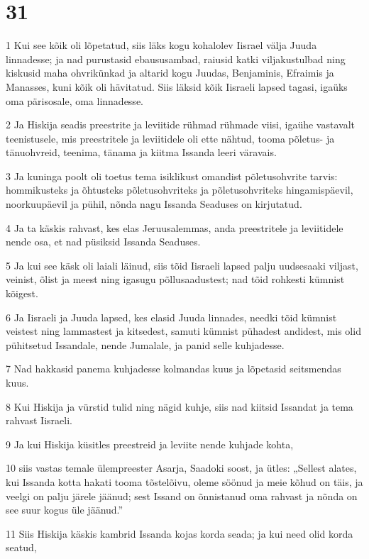 \chapter{31}

\par 1 Kui see kõik oli lõpetatud, siis läks kogu kohalolev Iisrael välja Juuda linnadesse; ja nad purustasid ebaususambad, raiusid katki viljakustulbad ning kiskusid maha ohvrikünkad ja altarid kogu Juudas, Benjaminis, Efraimis ja Manasses, kuni kõik oli hävitatud. Siis läksid kõik Iisraeli lapsed tagasi, igaüks oma pärisosale, oma linnadesse.
\par 2 Ja Hiskija seadis preestrite ja leviitide rühmad rühmade viisi, igaühe vastavalt teenistusele, mis preestritele ja leviitidele oli ette nähtud, tooma põletus- ja tänuohvreid, teenima, tänama ja kiitma Issanda leeri väravais.
\par 3 Ja kuninga poolt oli toetus tema isiklikust omandist põletusohvrite tarvis: hommikusteks ja õhtusteks põletusohvriteks ja põletusohvriteks hingamispäevil, noorkuupäevil ja pühil, nõnda nagu Issanda Seaduses on kirjutatud.
\par 4 Ja ta käskis rahvast, kes elas Jeruusalemmas, anda preestritele ja leviitidele nende osa, et nad püsiksid Issanda Seaduses.
\par 5 Ja kui see käsk oli laiali läinud, siis tõid Iisraeli lapsed palju uudsesaaki viljast, veinist, õlist ja meest ning igasugu põllusaadustest; nad tõid rohkesti kümnist kõigest.
\par 6 Ja Iisraeli ja Juuda lapsed, kes elasid Juuda linnades, needki tõid kümnist veistest ning lammastest ja kitsedest, samuti kümnist pühadest andidest, mis olid pühitsetud Issandale, nende Jumalale, ja panid selle kuhjadesse.
\par 7 Nad hakkasid panema kuhjadesse kolmandas kuus ja lõpetasid seitsmendas kuus.
\par 8 Kui Hiskija ja vürstid tulid ning nägid kuhje, siis nad kiitsid Issandat ja tema rahvast Iisraeli.
\par 9 Ja kui Hiskija küsitles preestreid ja leviite nende kuhjade kohta,
\par 10 siis vastas temale ülempreester Asarja, Saadoki soost, ja ütles: „Sellest alates, kui Issanda kotta hakati tooma tõstelõivu, oleme söönud ja meie kõhud on täis, ja veelgi on palju järele jäänud; sest Issand on õnnistanud oma rahvast ja nõnda on see suur kogus üle jäänud.”
\par 11 Siis Hiskija käskis kambrid Issanda kojas korda seada; ja kui need olid korda seatud,
